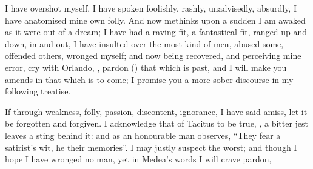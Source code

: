 I have overshot myself, I have spoken foolishly, rashly, unadvisedly, absurdly,
I have anatomised mine own folly. And now methinks upon a sudden I am awaked as
it were out of a dream; I have had a raving fit, a fantastical fit, ranged up
and down, in and out, I have insulted over the most kind of men, abused some,
offended others, wronged myself; and now being recovered, and perceiving mine
error, cry with Orlando, , pardon () that which is past, and I will make you amends in that which is to come;
I promise you a more sober discourse in my following treatise.

If through weakness, folly, passion, discontent, ignorance,
I have said amiss, let it be forgotten and forgiven. I acknowledge that of
Tacitus to be true, , a bitter jest leaves a sting behind
it: and as an honourable man observes, \enquote{They fear a
satirist's wit, he their memories}. I may justly suspect the worst; and though
I hope I have wronged no man, yet in Medea's words I will crave pardon,


